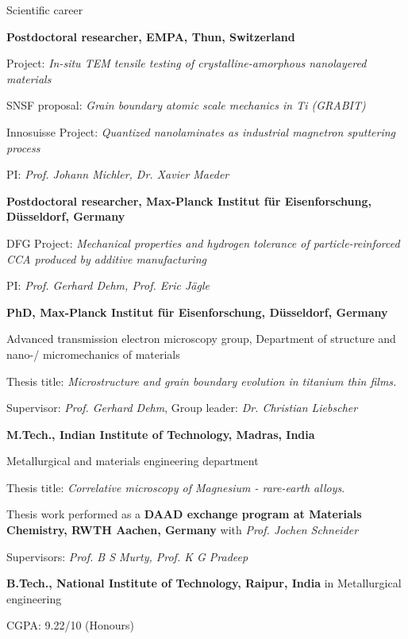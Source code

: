 \begin{rubric}{Scientific career}

\entry*[2024 -- Present]%
	\textbf{Postdoctoral researcher, EMPA, Thun, Switzerland}
    \par Project: \emph{In-situ TEM tensile testing of crystalline-amorphous nanolayered materials}
    \par SNSF proposal: \emph{Grain boundary atomic scale mechanics in Ti (GRABIT)}
	\par Innosuisse Project: \emph{Quantized nanolaminates as industrial magnetron sputtering process}
	\par PI: \emph{Prof. Johann Michler, Dr. Xavier Maeder}

\entry*[2022 -- 2024]%
	\textbf{Postdoctoral researcher, Max-Planck Institut für Eisenforschung, Düsseldorf, Germany}
	\par DFG Project: \emph{Mechanical properties and hydrogen tolerance of particle-reinforced CCA produced by additive manufacturing}
	\par PI: \emph{Prof. Gerhard Dehm, Prof. Eric Jägle}

\entry*[2018 -- 2022]%
	\textbf{PhD, Max-Planck Institut für Eisenforschung, Düsseldorf, Germany}
    \par Advanced transmission electron microscopy group, Department of structure and nano-/ micromechanics of materials
	\par Thesis title: \emph{Microstructure and grain boundary evolution in titanium thin films.}
	\par Supervisor: \emph{Prof. Gerhard Dehm}, Group leader: \emph{Dr. Christian Liebscher}

\entry*[2016 -- 2018]%
	\textbf{M.Tech., Indian Institute of Technology, Madras, India}
	\par Metallurgical and materials engineering department
	\par Thesis title: \emph{Correlative microscopy of Magnesium - rare-earth alloys}.
    \par Thesis work performed as a \textbf{DAAD exchange program at Materials Chemistry, RWTH Aachen, Germany} with \emph{Prof. Jochen Schneider}
	\par Supervisors: \emph{Prof. B S Murty, Prof. K G Pradeep}
	
\entry*[2012 -- 2016]%
	\textbf{B.Tech., National Institute of Technology, Raipur, India} in Metallurgical engineering
    \par CGPA: 9.22/10 (Honours)
	
\end{rubric}